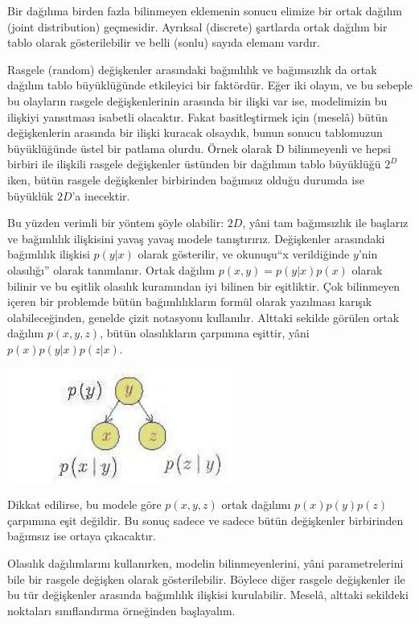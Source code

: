 \documentclass[12pt,fleqn]{article}\usepackage{../../common}
\begin{document}
Bir dağılıma birden fazla bilinmeyen eklemenin sonucu elimize bir ortak
dağılım (joint distribution) geçmesidir. Ayrıksal (discrete) şartlarda
ortak dağılım bir tablo olarak gösterilebilir ve belli (sonlu) sayıda
elemanı vardır.

Rasgele (random) değişkenler arasındaki bağımlılık ve bağımsızlık da ortak
dağılım tablo büyüklüğünde etkileyici bir faktördür. Eğer iki olayın, ve bu
sebeple bu olayların rasgele değişkenlerinin arasında bir ilişki var ise,
modelimizin bu ilişkiyi yansıtması isabetli olacaktır. Fakat basitleştirmek
için (meselâ) bütün değişkenlerin arasında bir ilişki kuracak olsaydık,
bunun sonucu tablomuzun büyüklüğünde üstel bir patlama olurdu. Örnek olarak
D bilinmeyenli ve hepsi birbiri ile ilişkili rasgele değişkenler üstünden
bir dağılımın tablo büyüklüğü $2^D$ iken, bütün rasgele değişkenler
birbirinden bağımsız olduğu durumda ise büyüklük $2D$'a inecektir.

Bu yüzden verimli bir yöntem şöyle olabilir: $2D$, yâni tam bağımsızlık ile
başlarız ve bağımlılık ilişkisini yavaş yavaş modele
tanıştırırız. Değişkenler arasındaki bağımlılık ilişkisi $p(y|x)$ olarak
gösterilir, ve okunuşu``x verildiğinde $y$'nin olasılığı'' olarak
tanımlanır. Ortak dağılım $p(x,y) = p(y|x)p(x)$ olarak bilinir ve bu
eşitlik olasılık kuramından iyi bilinen bir eşitliktir. Çok bilinmeyen
içeren bir problemde bütün bağımlılıkların formül olarak yazılması karışık
olabileceğinden, genelde çizit notasyonu kullanılır. Alttaki sekilde
görülen ortak dağılım $p(x,y,z)$, bütün olasılıkların çarpımına eşittir,
yâni $p(x)p(y|x)p(z|x)$.

\includegraphics[width=20em]{graph2.jpg}

Dikkat edilirse, bu modele göre $p(x,y,z)$ ortak dağılımı $p(x)p(y)p(z)$
çarpımına eşit değildir. Bu sonuç sadece ve sadece bütün değişkenler
birbirinden bağımsız ise ortaya çıkacaktır.

Olasılık dağılımlarını kullanırken, modelin bilinmeyenlerini, yâni
parametrelerini bile bir rasgele değişken olarak gösterilebilir. Böylece
diğer rasgele değişkenler ile bu tür değişkenler arasında bağımlılık
ilişkisi kurulabilir. Meselâ, alttaki sekildeki noktaları sınıflandırma
örneğinden başlayalım.
\end{document}
